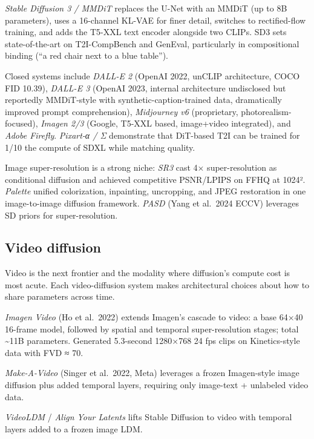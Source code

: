 \documentclass{article}
\begin{document}
\emph{Stable Diffusion 3 / MMDiT} \citep{esser20242024} replaces the U-Net with an MMDiT (up to 8B parameters), uses a 16-channel KL-VAE for finer detail, switches to rectified-flow training, and adds the T5-XXL text encoder alongside two CLIPs. SD3 sets state-of-the-art on T2I-CompBench and GenEval, particularly in compositional binding (``a red chair next to a blue table'').

Closed systems include \emph{DALL-E 2} (OpenAI 2022, unCLIP architecture, COCO FID 10.39), \emph{DALL-E 3} (OpenAI 2023, internal architecture undisclosed but reportedly MMDiT-style with synthetic-caption-trained data, dramatically improved prompt comprehension), \emph{Midjourney v6} (proprietary, photorealism-focused), \emph{Imagen 2/3} (Google, T5-XXL based, image+video integrated), and \emph{Adobe Firefly}. \emph{Pixart-α / Σ} \citep{chen20242024} demonstrate that DiT-based T2I can be trained for 1/10 the compute of SDXL while matching quality.

Image super-resolution is a strong niche: \emph{SR3} \citep{saharia20222022} cast 4× super-resolution as conditional diffusion and achieved competitive PSNR/LPIPS on FFHQ at 1024². \emph{Palette} \citep{saharia20222022} unified colorization, inpainting, uncropping, and JPEG restoration in one image-to-image diffusion framework. \emph{PASD} (Yang et al.~2024 ECCV) leverages SD priors for super-resolution.

\subsection{Video diffusion}\label{video-diffusion}

Video is the next frontier and the modality where diffusion's compute cost is most acute. Each video-diffusion system makes architectural choices about how to share parameters across time.

\emph{Imagen Video} (Ho et al.~2022) extends Imagen's cascade to video: a base 64×40 16-frame model, followed by spatial and temporal super-resolution stages; total \textasciitilde11B parameters. Generated 5.3-second 1280×768 24 fps clips on Kinetics-style data with FVD ≈ 70.

\emph{Make-A-Video} (Singer et al.~2022, Meta) leverages a frozen Imagen-style image diffusion plus added temporal layers, requiring only image-text + unlabeled video data.

\emph{VideoLDM} / \emph{Align Your Latents} \citep{blattmann20232023} lifts Stable Diffusion to video with temporal layers added to a frozen image LDM.
\end{document}
